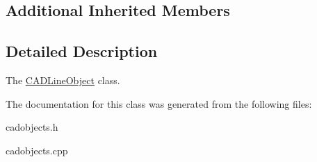 \subsection*{Additional Inherited Members}


\subsection{Detailed Description}
The \hyperlink{class_c_a_d_line_object}{C\+A\+D\+Line\+Object} class. 

The documentation for this class was generated from the following files\+:\begin{DoxyCompactItemize}
\item 
cadobjects.\+h\item 
cadobjects.\+cpp\end{DoxyCompactItemize}
